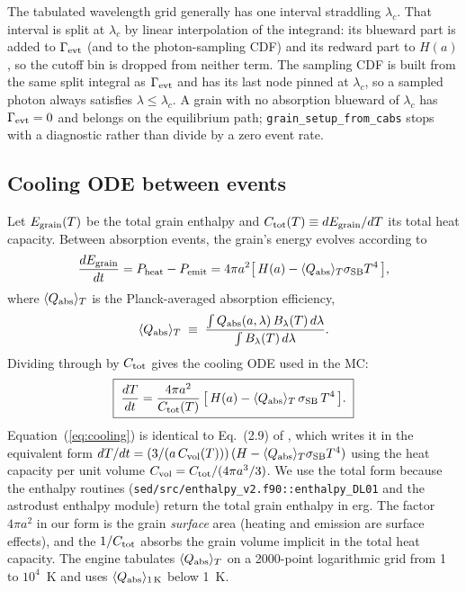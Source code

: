 \documentclass{my_memo}
\newcommand{\Qabs}{Q_{\rm abs}}
\newcommand{\QplT}{\langle Q_{\rm abs} \rangle_T}
\newcommand{\Ctot}{C_{\rm tot}}
\newcommand{\Cvol}{C_{\rm vol}}
\newcommand{\sigmaSB}{\sigma_{\rm SB}}
\newcommand{\Blam}{B_\lambda}
\begin{document}
The tabulated wavelength grid generally has one interval straddling
$\lambda_c$.  That interval is split at $\lambda_c$ by linear
interpolation of the integrand: its blueward part is added to
$\Gamma_{\rm evt}$ (and to the photon-sampling CDF) and its redward
part to $H(a)$, so the cutoff bin is dropped from neither term.  The
sampling CDF is built from the same split integral as
$\Gamma_{\rm evt}$ and has its last node pinned at $\lambda_c$, so a
sampled photon always satisfies $\lambda \le \lambda_c$.  A grain with
no absorption blueward of $\lambda_c$ has $\Gamma_{\rm evt}=0$ and
belongs on the equilibrium path; \texttt{grain\_setup\_from\_cabs}
stops with a diagnostic rather than divide by a zero event rate.

\subsection{Cooling ODE between events}

Let $E_{\rm grain}(T)$ be the total grain enthalpy and
$\Ctot(T) \equiv dE_{\rm grain}/dT$ its total heat capacity.  Between
absorption events, the grain's energy evolves according to
\begin{equation}
\frac{dE_{\rm grain}}{dt} = P_{\rm heat} - P_{\rm emit}
   = 4\pi a^2 \bigl[\,H(a) - \QplT \sigmaSB T^4\,\bigr],
\end{equation}
where $\QplT$ is the Planck-averaged absorption efficiency,
\begin{equation}\label{eq:Qpl}
\QplT \;\equiv\;
   \frac{\int \Qabs(a,\lambda)\,\Blam(T)\,d\lambda}
        {\int \Blam(T)\,d\lambda}.
\end{equation}
Dividing through by $\Ctot$ gives the cooling ODE used in the MC:
\begin{equation}\label{eq:cooling}
\boxed{\;\frac{dT}{dt}
   = \frac{4\pi a^2}{\Ctot(T)}\,
     \bigl[\,H(a) - \QplT\,\sigmaSB\,T^4\,\bigr].\;}
\end{equation}
Equation~(\ref{eq:cooling}) is identical to Eq.~(2.9) of
\citet{DraineAnderson1985}, which writes it in the equivalent form
$dT/dt = (3/(a\,\Cvol(T)))\,(H - \QplT\sigmaSB T^4)$ using the heat
capacity per unit volume $\Cvol = \Ctot/(4\pi a^3/3)$.  We use the
total form because the enthalpy routines
(\texttt{sed/src/enthalpy\_v2.f90::enthalpy\_DL01} and the astrodust
enthalpy module) return the total grain enthalpy in erg.  The factor
$4\pi a^2$ in our form is the grain \emph{surface} area (heating and
emission are surface effects), and the $1/\Ctot$ absorbs the grain
volume implicit in the total heat capacity. The engine tabulates
$\QplT$ on a 2000-point logarithmic grid from 1 to $10^4$~K and uses
$\langle\Qabs\rangle_{1\,\rm K}$ below 1~K.
\end{document}
